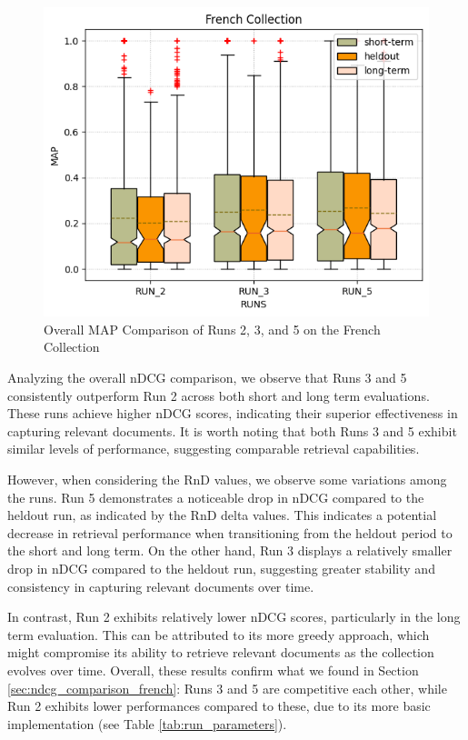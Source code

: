 \begin{figure}[!h]
    \centering
    \includegraphics[width=\linewidth]{figure/StatisticalAnalysis/BoxPlot/MAP French.png}
    \caption{Overall MAP Comparison of Runs 2, 3, and 5 on the French Collection}
    \label{fig:map_french}
\end{figure}

Analyzing the overall \ac{nDCG} comparison, we observe that Runs 3 and 5 consistently outperform Run 2 across both short and long term evaluations. 
These runs achieve higher \ac{nDCG} scores, indicating their superior effectiveness in capturing relevant documents. 
It is worth noting that both Runs 3 and 5 exhibit similar levels of performance, suggesting comparable retrieval capabilities.

However, when considering the RnD values, we observe some variations among the runs. Run 5 demonstrates a noticeable drop in \ac{nDCG} compared to the heldout run, as indicated by the RnD delta values. 
This indicates a potential decrease in retrieval performance when transitioning from the heldout period to the short and long term. 
On the other hand, Run 3 displays a relatively smaller drop in \ac{nDCG} compared to the heldout run, suggesting greater stability and consistency in capturing relevant documents over time.

In contrast, Run 2 exhibits relatively lower \ac{nDCG} scores, particularly in the long term evaluation. This can be attributed to its more greedy approach, which might compromise its ability to retrieve relevant documents as the collection evolves over time.
Overall, these results confirm what we found in Section \ref{sec:ndcg_comparison_french}: Runs 3 and 5 are competitive each other, while Run 2 exhibits lower performances compared to these, due to its more basic implementation (see Table \ref{tab:run_parameters}). 

